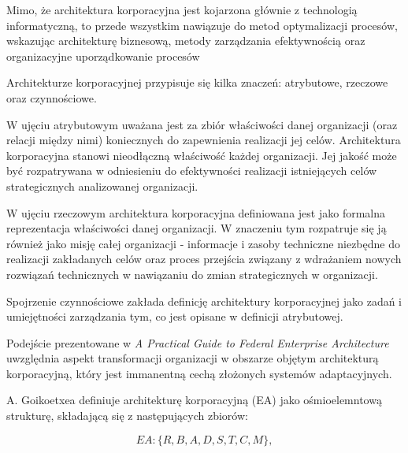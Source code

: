 Mimo, że architektura korporacyjna jest kojarzona głównie z technologią informatyczną, to przede wszystkim nawiązuje do metod optymalizacji procesów, wskazując architekturę biznesową, metody zarządzania efektywnością oraz organizacyjne uporządkowanie procesów\cite{ArchKorpSzymSup}

Architekturze korporacyjnej przypisuje się kilka znaczeń: atrybutowe, rzeczowe oraz czynnościowe.

W ujęciu atrybutowym uważana jest za zbiór właściwości danej organizacji (oraz relacji między nimi) koniecznych do zapewnienia realizacji jej celów. Architektura korporacyjna stanowi nieodłączną właściwość każdej organizacji. Jej jakość może być rozpatrywana w odniesieniu do efektywności realizacji istniejących celów strategicznych analizowanej organizacji.\cite{ArchKorpSob}

W ujęciu rzeczowym architektura korporacyjna definiowana jest jako formalna reprezentacja właściwości danej organizacji. W znaczeniu tym rozpatruje się ją również jako misję całej organizacji - informacje i zasoby techniczne niezbędne do realizacji zakładanych celów oraz proces przejścia związany z wdrażaniem nowych rozwiązań technicznych w nawiązaniu do zmian strategicznych w organizacji.\cite{ArchKorpSob}

Spojrzenie czynnościowe zakłada definicję architektury korporacyjnej jako zadań i umiejętności zarządzania tym, co jest opisane w definicji atrybutowej.\cite{ArchKorpSzymSup}

Podejście prezentowane w \emph{A Practical Guide to Federal Enterprise Architecture} uwzględnia aspekt transformacji organizacji w obszarze objętym architekturą korporacyjną, który jest immanentną cechą złożonych systemów adaptacyjnych.\cite{ArchKorpSob} 

A. Goikoetxea definiuje architekturę korporacyjną (EA) jako ośmioelemntową strukturę, składającą się z następujących zbiorów:

\begin{center}
\begin{equation}EA: \{R, B, A, D, S, T, C, M\},\end{equation}
\end{center}

